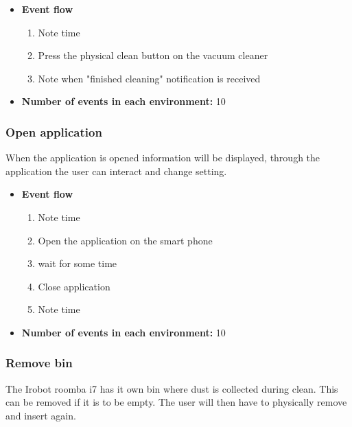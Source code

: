 \begin{itemize}
    \item \textbf{Event flow} \begin{enumerate}
                                    \item Note time
                                    \item Press the physical clean button on the vacuum cleaner
                                    \item Note when "finished cleaning" notification is received
                                \end{enumerate}
    \item \textbf{Number of events in each environment:} 10
\end{itemize}

\subsubsection{Open application}
When the application is opened information will be displayed, through the application the user can interact and change setting. 

\begin{itemize}
    \item \textbf{Event flow} \begin{enumerate}
                                    \item Note time
                                    \item Open the application on the smart phone
                                    \item wait for some time
                                    \item Close application
                                    \item Note time
                                \end{enumerate}
    \item \textbf{Number of events in each environment:} 10
\end{itemize}

\subsubsection{Remove bin}
The Irobot roomba i7 has it own bin where dust is collected during clean. This can be removed if it is to be empty. The user will then have to physically remove and insert again. 

